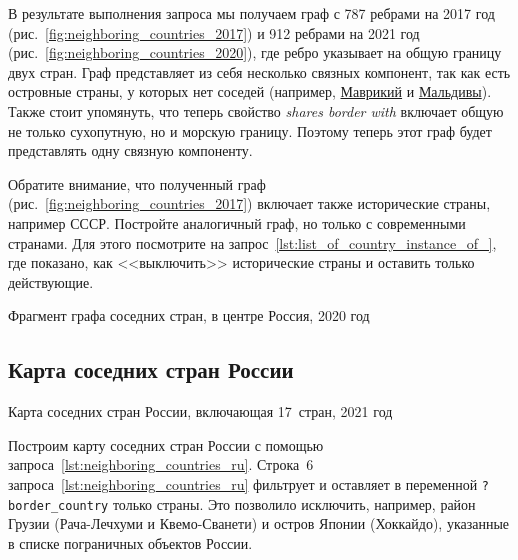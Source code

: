 В результате выполнения запроса мы получаем граф с 787 ребрами на 2017 год 
(рис.~\ref{fig:neighboring_countries_2017}) 
и 912 ребрами на 2021 год (рис.~\ref{fig:neighboring_countries_2020}), 
где ребро указывает на общую границу двух стран. 
Граф представляет из себя несколько связных компонент, 
так как есть островные страны, у которых нет соседей 
(например, \href{https://w.wiki/vC7}{Маврикий} и \href{https://w.wiki/vC8}{Мальдивы}). 
Также стоит упомянуть, что теперь свойство {\textit{shares border with}} 
включает общую не только сухопутную, но и морскую границу. 
Поэтому теперь этот граф будет представлять одну связную компоненту. 

Обратите внимание, что полученный граф (рис.~\ref{fig:neighboring_countries_2017}) 
включает также исторические страны, например СССР. 
Постройте аналогичный граф, но только с современными странами. 
Для этого посмотрите на запрос~\ref{lst:list_of_country_instance_of_}, где показано, 
как <<выключить>> исторические страны и оставить только действующие. 

\begin{marginfigure}
	{
		\setlength{\fboxsep}{0pt}%
		\setlength{\fboxrule}{1pt}%
	}
    \caption[Фрагмент графа соседних стран, 2020 год.]{Фрагмент графа соседних стран, в центре Россия, 2020 год}
	\label{fig:neighboring_countries_2020}%
\end{marginfigure}



\newpage
\subsection{Карта соседних стран России}
%
\begin{marginfigure}[2\baselineskip]
	{
		\setlength{\fboxsep}{0pt}%
		\setlength{\fboxrule}{1pt}%
	}
    \caption[Карта соседних стран России, 2021 год.]{Карта соседних стран России, включающая 17~стран, 2021 год}
	\label{fig:neighboring_countries_ru_2020}%
\end{marginfigure}


Построим карту соседних стран России с помощью запроса~\ref{lst:neighboring_countries_ru}.
Строка~6 запроса~\ref{lst:neighboring_countries_ru} 
фильтрует и оставляет в переменной \lstinline|?border_country| только страны.
Это позволило исключить, например, район Грузии (Рача-Лечхуми и Квемо-Сванети) 
и остров Японии (Хоккайдо), указанные в списке пограничных объектов России.

